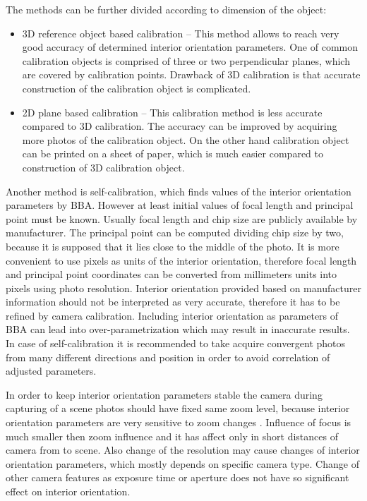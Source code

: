 \documentclass[a4paper,12pt]{article}
\begin{document}
The methods can be further divided according to dimension of the object:


\begin{itemize}
\item 3D reference object based calibration -- This method allows to reach very good accuracy of determined 
interior orientation parameters. One of common calibration objects is comprised of three or two
perpendicular planes, which are covered by calibration points. Drawback of 3D calibration 
is that accurate construction of the calibration object is complicated.
\item 2D plane based calibration -- This calibration method is less accurate compared to 3D calibration. 
The accuracy can be improved by acquiring more photos of the calibration object.
On the other hand calibration object can be printed on a sheet of paper, which is much 
easier compared to construction of 3D calibration object.
\end{itemize}


Another method is self-calibration, which finds values of the interior orientation parameters by BBA.
However at least initial values of focal length and principal point must be known.
Usually focal length and chip size are publicly available by manufacturer. The principal point 
can be computed dividing chip size by two, because it is supposed that it lies close to 
the middle of the photo.
It is more convenient to use 
pixels as units of the interior orientation, therefore focal length and principal point coordinates can be 
converted from millimeters units into pixels using photo resolution. 
Interior orientation provided based on manufacturer information should not be interpreted as very accurate, therefore 
it has  to be refined by camera calibration.
Including interior orientation as parameters of BBA
can lead into over-parametrization which may result in inaccurate results.
In case of self-calibration it is recommended to take acquire convergent photos from many different directions and position in order
to avoid correlation of adjusted parameters. 


In order to keep interior orientation parameters stable the camera during capturing of a scene photos should have fixed same zoom level,
because interior orientation parameters are very sensitive  to zoom changes \cite{labe2004geometric}.
Influence of focus is  much smaller then zoom influence and it has affect only in short distances of camera
from to scene.
Also change of the resolution may cause changes of interior orientation parameters, which mostly depends 
on specific camera type. 
Change of other camera features as exposure time or aperture does not have so significant effect on interior
orientation.
\end{document}
